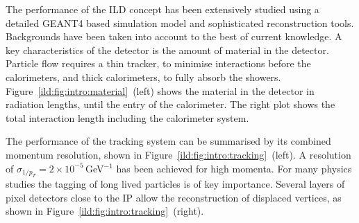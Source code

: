 The performance of the ILD concept has been extensively studied using a detailed GEANT4 based simulation model and sophisticated reconstruction tools. Backgrounds have been taken into account to the best of current knowledge. 
A key characteristics of the detector is the amount of material in the detector. Particle flow requires a thin tracker, to minimise interactions before the calorimeters, and thick calorimeters, to fully absorb the showers. Figure~\ref{ild:fig:intro:material}~(left) shows the material in the detector in radiation lengths, until the entry of the calorimeter. The right plot shows the total interaction length including the calorimeter system. 

The performance of the tracking system can be summarised by its combined momentum resolution, shown in Figure~\ref{ild:fig:intro:tracking}~(left). A resolution of $\sigma_{1/p_T} = 2 \times 10^{-5}$\,GeV$^{-1}$ has been achieved for high momenta. For many physics studies the tagging of long lived particles is of key importance. Several layers of pixel detectors close to the IP allow the reconstruction of displaced vertices, as shown in Figure~\ref{ild:fig:intro:tracking}~(right).




